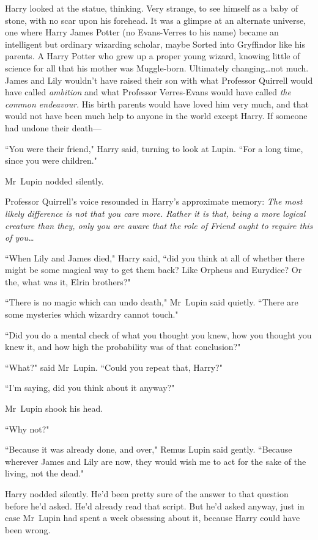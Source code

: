Harry looked at the statue, thinking. Very strange, to see himself as a baby of stone, with no scar upon his forehead. It was a glimpse at an alternate universe, one where Harry James Potter (no Evans-Verres to his name) became an intelligent but ordinary wizarding scholar, maybe Sorted into Gryffindor like his parents. A Harry Potter who grew up a proper young wizard, knowing little of science for all that his mother was Muggle-born. Ultimately changing…not much. James and Lily wouldn't have raised their son with what Professor Quirrell would have called \emph{ambition} and what Professor Verres-Evans would have called \emph{the common endeavour}. His birth parents would have loved him very much, and that would not have been much help to anyone in the world except Harry. If someone had undone their death—

``You were their friend," Harry said, turning to look at Lupin. ``For a long time, since you were children."

Mr~Lupin nodded silently.

Professor Quirrell's voice resounded in Harry's approximate memory: \emph{The most likely difference is not that you care more. Rather it is that, being a more logical creature than they, only you are aware that the role of Friend ought to require this of you…}

``When Lily and James died," Harry said, ``did you think at all of whether there might be some magical way to get them back? Like Orpheus and Eurydice? Or the, what was it, Elrin brothers?"

``There is no magic which can undo death," Mr~Lupin said quietly. ``There are some mysteries which wizardry cannot touch."

``Did you do a mental check of what you thought you knew, how you thought you knew it, and how high the probability was of that conclusion?"

``What?" said Mr~Lupin. ``Could you repeat that, Harry?"

``I'm saying, did you think about it anyway?"

Mr~Lupin shook his head.

``Why not?"

``Because it was already done, and over," Remus Lupin said gently. ``Because wherever James and Lily are now, they would wish me to act for the sake of the living, not the dead."

Harry nodded silently. He'd been pretty sure of the answer to that question before he'd asked. He'd already read that script. But he'd asked anyway, just in case Mr~Lupin had spent a week obsessing about it, because Harry could have been wrong.

